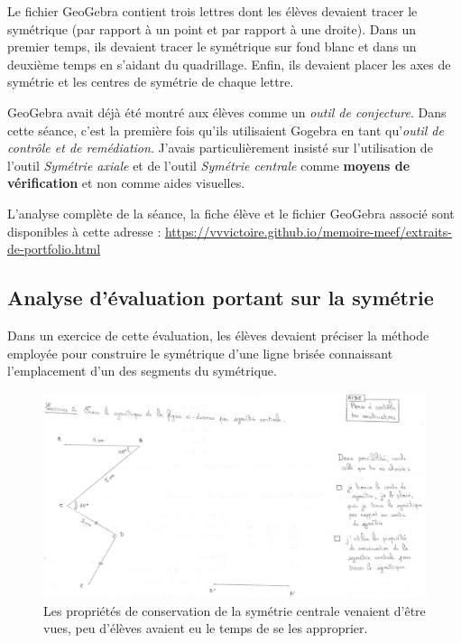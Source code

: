 Le fichier GeoGebra contient trois lettres dont les élèves devaient tracer le symétrique (par rapport à un point et par rapport à une droite). Dans un premier temps, ils devaient tracer le symétrique sur fond blanc et dans un deuxième temps en s'aidant du quadrillage. Enfin, ils devaient placer les axes de symétrie et les centres de symétrie de chaque lettre.

GeoGebra avait déjà été montré aux élèves comme un \textit{outil de conjecture}. Dans cette séance, c'est la première fois qu'ils utilisaient Gogebra en tant qu'\textit{outil de contrôle et de remédiation}. J'avais particulièrement insisté sur l'utilisation de l'outil \textit{Symétrie axiale} et de l'outil \textit{Symétrie centrale} comme \textbf{moyens de vérification} et non comme aides visuelles.

L'analyse complète de la séance, la fiche élève et le fichier GeoGebra associé sont disponibles à cette adresse : \url{https://vvvictoire.github.io/memoire-meef/extraits-de-portfolio.html}

\subsection{Analyse d'évaluation portant sur la symétrie}\label{annexe:symetrie-eval}

Dans un exercice de cette évaluation, les élèves devaient préciser la méthode employée pour construire le symétrique d'une ligne brisée connaissant l'emplacement d'un des segments du symétrique.

\begin{figure}[h!]
    \centering
    \includegraphics[width=\linewidth]{img/page1-exo2.png}
    \caption{Les propriétés de conservation de la symétrie centrale venaient d'être vues, peu d'élèves avaient eu le temps de se les approprier.}
    \label{fig:xav-eval}
\end{figure}

